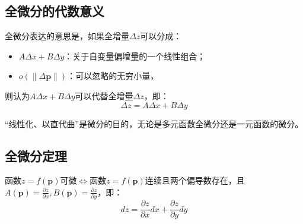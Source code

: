 \subsection{全微分的代数意义}

全微分表达的意思是，如果全增量$\Delta z$可以分成：
\begin{itemize}
    \item $A\Delta x+B\Delta y$：关于自变量偏增量的一个线性组合；
    \item $o\left( \left\| \Delta \boldsymbol{p} \right\| \right) $：可以忽略的无穷小量，
\end{itemize}
则认为$A\Delta x+B\Delta y$可以代替全增量$\Delta z$，即：
\[
\Delta z=A\Delta x+B\Delta y
\]

\begin{tcolorbox}
“线性化、以直代曲”是微分的目的，无论是多元函数全微分还是一元函数的微分。
\end{tcolorbox}

\subsection{全微分定理}

\begin{theorem}[全微分定理]
函数$z=f\left( \boldsymbol{p} \right) $可微$\Leftrightarrow $函数$z=f\left( \boldsymbol{p} \right) $连续且两个偏导数存在，且$A\left( \boldsymbol{p} \right) =\frac{\partial z}{\partial x},B\left( \boldsymbol{p} \right) =\frac{\partial z}{\partial y}$，即：
\[
dz=\frac{\partial z}{\partial x}dx+\frac{\partial z}{\partial y}dy
\]
\end{theorem}

